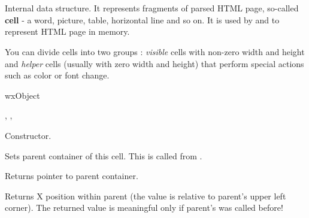 %
%


\section{}\label{wxhtmlcell}

Internal data structure. It represents fragments of parsed HTML
page, so-called {\bf cell} - a word, picture, table, horizontal line and so on.
It is used by  and
 to represent HTML page in memory.

You can divide cells into two groups : {\it visible} cells with non-zero width and
height and {\it helper} cells (usually with zero width and height) that
perform special actions such as color or font change.



wxObject


,
,



\label{wxhtmlcellwxhtmlcell}


Constructor.


\label{wxhtmlcellsetparent}


Sets parent container of this cell. This is called from 
.

\label{wxhtmlcellgetparent}


Returns pointer to parent container.

\label{wxhtmlcellgetposx}


Returns X position within parent (the value is relative to parent's
upper left corner). The returned value is meaningful only if 
parent's  was called before!

